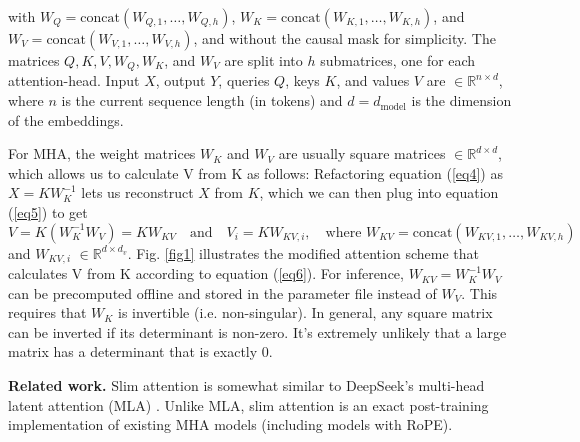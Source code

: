 \documentclass{article}
\newcommand{\eR}[2]{$\in \mathbb{R}^{#1 \times #2}$} %
\begin{document}
with $W_Q = \text{concat}(W_{Q,1}, \ldots, W_{Q,h})$, $W_K = \text{concat}(W_{K,1}, \ldots, W_{K,h})$, and $W_V = \text{concat}(W_{V,1}, \ldots, W_{V,h})$, and without the causal mask for simplicity. The matrices $Q, K, V, W_Q, W_K$, and $W_V$ are split into $h$ submatrices, one for each attention-head. Input $X$, output $Y$, queries $Q$, keys $K$, and values $V$ are \eR{n}{d}, where $n$ is the current sequence length (in tokens) and $d = d_{\text{model}}$ is the dimension of the embeddings.

For MHA, the weight matrices $W_K$ and $W_V$ are usually square matrices \eR{d}{d}, which allows us to calculate V from K as follows: Refactoring equation (\ref{eq4}) as $X = K W_K^{-1}$ lets us reconstruct $X$ from $K$, which we can then plug into equation (\ref{eq5}) to get
\begin{equation}
  V = K (W_K^{-1} W_V) = K W_{KV} \quad \text{and} \quad V_i = K W_{KV,i}, \quad \text{where } W_{KV} = \text{concat}(W_{KV,1}, \ldots, W_{KV,h})
\label{eq6} \end{equation}
and $W_{KV,i}$ \eR{d}{d_v}. Fig. \ref{fig1} illustrates the modified attention scheme that calculates V from K according to equation (\ref{eq6}). For inference, $W_{KV} = W_K^{-1} W_V$ can be precomputed offline and stored in the parameter file instead of $W_V$. This requires that $W_K$ is invertible (i.e. non-singular). In general, any square matrix can be inverted if its determinant is non-zero. It’s extremely unlikely that a large matrix has a determinant that is exactly 0.

\textbf{Related work.} Slim attention is somewhat similar to DeepSeek’s multi-head latent attention (MLA) \citep{deepseek-v2}. Unlike MLA, slim attention is an exact post-training implementation of existing MHA models (including models with RoPE).
\end{document}
